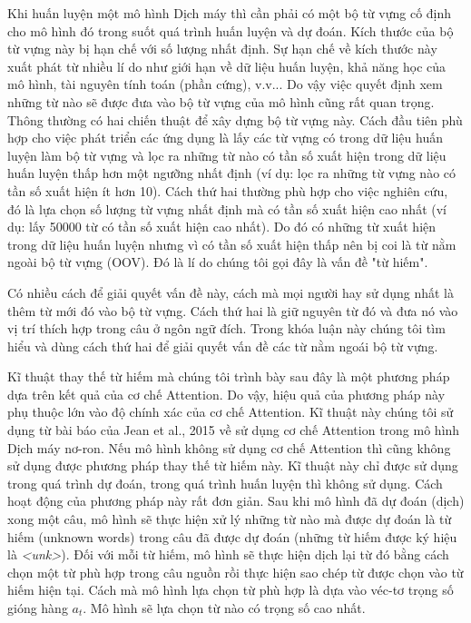 Khi huấn luyện một mô hình Dịch máy thì cần phải có một bộ từ vựng cố định cho mô hình đó trong suốt quá trình huấn luyện và dự đoán. Kích thước của bộ từ vựng này bị hạn chế với số lượng nhất định. Sự hạn chế về kích thước này xuất phát từ nhiều lí do như giới hạn về dữ liệu huấn luyện, khả năng học của mô hình, tài nguyên tính toán (phần cứng), v.v... Do vậy việc quyết định xem những từ nào sẽ được đưa vào bộ từ vựng của mô hình cũng rất quan trọng. Thông thường có hai chiến thuật để xây dựng bộ từ vựng này. Cách đầu tiên phù hợp cho việc phát triển các ứng dụng là lấy các từ vựng có trong dữ liệu huấn luyện làm bộ từ vựng và lọc ra những từ nào có tần số xuất hiện trong dữ liệu huấn luyện thấp hơn một ngưỡng nhất định (ví dụ: lọc ra những từ vựng nào có tần số xuất hiện ít hơn 10). Cách thứ hai thường phù hợp cho việc nghiên cứu, đó là lựa chọn số lượng từ vựng nhất định mà có tần số xuất hiện cao nhất (ví dụ: lấy 50000 từ có tần số xuất hiện cao nhất). Do đó có những từ xuất hiện trong dữ liệu huấn luyện nhưng vì có tần số xuất hiện thấp nên bị coi là từ nằm ngoài bộ từ vựng (OOV). Đó là lí do chúng tôi gọi đây là vấn đề "từ hiếm".

Có nhiều cách để giải quyết vấn đề này, cách mà mọi người hay sử dụng nhất là thêm từ mới đó vào bộ từ vựng. Cách thứ hai là giữ nguyên từ đó và đưa nó vào vị trí thích hợp trong câu ở ngôn ngữ đích. Trong khóa luận này chúng tôi tìm hiểu và dùng cách thứ hai để giải quyết vấn đề các từ nằm ngoái bộ từ vựng.

Kĩ thuật thay thế từ hiếm mà chúng tôi trình bày sau đây là một phương pháp dựa trên kết quả của cơ chế Attention. Do vậy, hiệu quả của phương pháp này phụ thuộc lớn vào độ chính xác của cơ chế Attention. Kĩ thuật này chúng tôi sử dụng từ bài báo của Jean et al., 2015 \cite{JeanUnkRepl} về sử dụng cơ chế Attention trong mô hình Dịch máy nơ-ron. Nếu mô hình không sử dụng cơ chế Attention thì cũng không sử dụng được phương pháp thay thế từ hiếm này. Kĩ thuật này chỉ được sử dụng trong quá trình dự đoán, trong quá trình huấn luyện thì không sử dụng. Cách hoạt động của phương pháp này rất đơn giản. Sau khi mô hình đã dự đoán (dịch) xong một câu, mô hình sẽ thực hiện xử lý những từ nào mà được dự đoán là từ hiếm (unknown words) trong câu đã được dự đoán (những từ hiếm được ký hiệu là \textit{<unk>}). Đối với mỗi từ hiếm, mô hình sẽ thực hiện dịch lại từ đó bằng cách chọn một từ phù hợp trong câu nguồn rồi thực hiện sao chép từ được chọn vào từ hiếm hiện tại. Cách mà mô hình lựa chọn từ phù hợp là dựa vào véc-tơ trọng số gióng hàng $a_t$. Mô hình sẽ lựa chọn từ nào có trọng số cao nhất.

